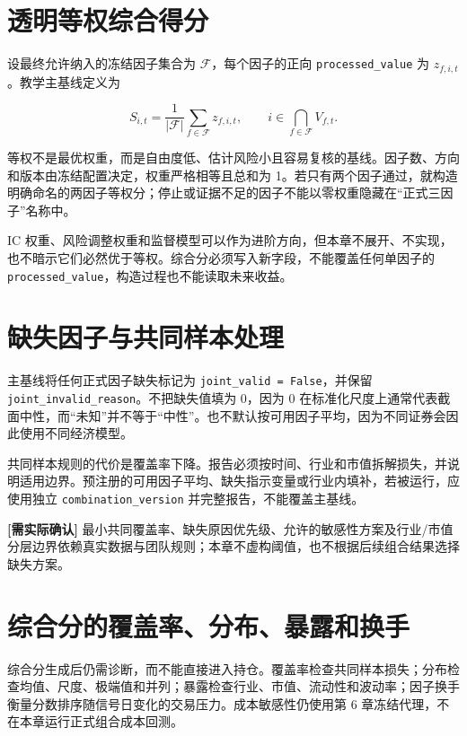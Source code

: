 \section{透明等权综合得分}

设最终允许纳入的冻结因子集合为 \(\mathcal{F}\)，每个因子的正向 \texttt{processed\_value} 为 \(z_{f,i,t}\)。教学主基线定义为

\begin{equation}
  S_{i,t}
  = \frac{1}{|\mathcal{F}|}
    \sum_{f\in\mathcal{F}} z_{f,i,t},
  \qquad i\in \bigcap_{f\in\mathcal{F}} V_{f,t}.
  \label{eq:ch08-equal-weight-score}
\end{equation}

等权不是最优权重，而是自由度低、估计风险小且容易复核的基线。因子数、方向和版本由冻结配置决定，权重严格相等且总和为 1。若只有两个因子通过，就构造明确命名的两因子等权分；停止或证据不足的因子不能以零权重隐藏在“正式三因子”名称中。

IC 权重、风险调整权重和监督模型可以作为进阶方向，但本章不展开、不实现，也不暗示它们必然优于等权。综合分必须写入新字段，不能覆盖任何单因子的 \texttt{processed\_value}，构造过程也不能读取未来收益。

\section{缺失因子与共同样本处理}

主基线将任何正式因子缺失标记为 \texttt{joint\_valid = False}，并保留 \texttt{joint\_invalid\_reason}。不把缺失值填为 0，因为 0 在标准化尺度上通常代表截面中性，而“未知”并不等于“中性”。也不默认按可用因子平均，因为不同证券会因此使用不同经济模型。

共同样本规则的代价是覆盖率下降。报告必须按时间、行业和市值拆解损失，并说明适用边界。预注册的可用因子平均、缺失指示变量或行业内填补，若被运行，应使用独立 \texttt{combination\_version} 并完整报告，不能覆盖主基线。

\begin{confirmbox}
\textbf{[需实际确认]} 最小共同覆盖率、缺失原因优先级、允许的敏感性方案及行业/市值分层边界依赖真实数据与团队规则；本章不虚构阈值，也不根据后续组合结果选择缺失方案。
\end{confirmbox}

\section{综合分的覆盖率、分布、暴露和换手}

综合分生成后仍需诊断，而不能直接进入持仓。覆盖率检查共同样本损失；分布检查均值、尺度、极端值和并列；暴露检查行业、市值、流动性和波动率；因子换手衡量分数排序随信号日变化的交易压力。成本敏感性仍使用第 6 章冻结代理，不在本章运行正式组合成本回测。

